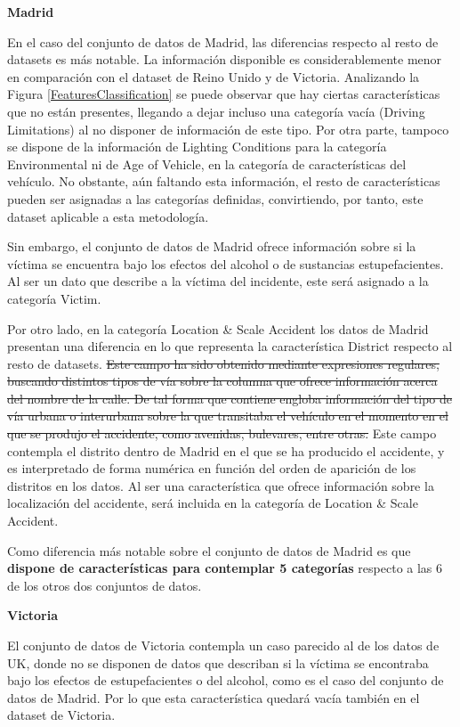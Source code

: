 \documentclass{uathesis-es}
\begin{document}
{\textbf{Madrid}

En el caso del conjunto de datos de Madrid, las diferencias respecto al resto de datasets es más notable. La información disponible es considerablemente menor en comparación con el dataset de Reino Unido y de Victoria. Analizando la Figura \ref{FeaturesClassification} se puede observar que hay ciertas características que no están presentes, llegando a dejar incluso una categoría vacía (Driving Limitations) al no disponer de información de este tipo. Por otra parte, tampoco se dispone de la información de Lighting Conditions para la categoría Environmental ni de Age of Vehicle, en la categoría de características del vehículo. No obstante, aún faltando esta información, el resto de características pueden ser asignadas a las categorías definidas, convirtiendo, por tanto, este dataset aplicable a esta metodología.

Sin embargo, el conjunto de datos de Madrid ofrece información sobre si la víctima se encuentra bajo los efectos del alcohol o de sustancias estupefacientes. Al ser un dato que describe a la víctima del incidente, este será asignado a la categoría Victim.

Por otro lado, en la categoría Location \& Scale Accident los datos de Madrid presentan una diferencia en lo que representa la característica District respecto al resto de datasets. \sout{Este campo ha sido obtenido mediante expresiones regulares, buscando distintos tipos de vía sobre la columna que ofrece información acerca del nombre de la calle. De tal forma que contiene engloba información del tipo de vía urbana o interurbana sobre la que transitaba el vehículo en el momento en el que se produjo el accidente, como avenidas, bulevares, entre otras. } Este campo contempla el distrito dentro de Madrid en el que se ha producido el accidente, y es interpretado de forma numérica en función del orden de aparición de los distritos en los datos. Al ser una característica que ofrece información sobre la localización del accidente, será incluida en la categoría de Location \& Scale Accident.

Como diferencia más notable sobre el conjunto de datos de Madrid es que \textbf{dispone de características para contemplar 5 categorías} respecto a las 6 de los otros dos conjuntos de datos.

\textbf{Victoria}

El conjunto de datos de Victoria contempla un caso parecido al de los datos de UK, donde no se disponen de datos que describan si la víctima se encontraba bajo los efectos de estupefacientes o del alcohol, como es el caso del conjunto de datos de Madrid. Por lo que esta característica quedará vacía también en el dataset de Victoria.

}
\end{document}
